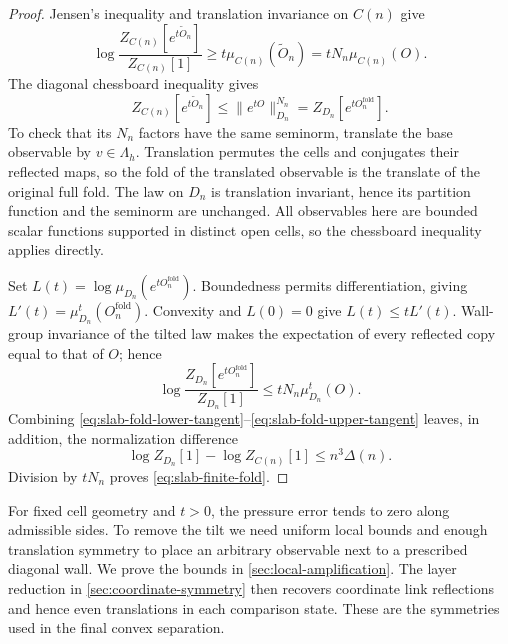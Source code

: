 \begin{proof}
Jensen's inequality and translation invariance on $C(n)$ give
\begin{equation}\label{eq:slab-fold-lower-tangent}
 \log\frac{Z_{C(n)}[e^{t\widetilde O_n}]}{Z_{C(n)}[1]}
                     \ge t\mu_{C(n)}(\widetilde O_n)
                     =tN_n\mu_{C(n)}(O).
\end{equation}
The diagonal chessboard inequality gives
\begin{equation}\label{eq:slab-fold-change}
 Z_{C(n)}[e^{t\widetilde O_n}]
               \le\|e^{tO}\|_{D_n}^{N_n}
               =Z_{D_n}[e^{tO_n^{\mathrm{fold}}}].
\end{equation}
To check that its $N_n$ factors have the same seminorm, translate
the base observable by $v\in\Lambda_h$. Translation permutes the cells
and conjugates their reflected maps, so the fold of the translated
observable is the translate of the original full fold. The law on
$D_n$ is translation invariant, hence its partition function and
the seminorm are unchanged. All observables here are bounded scalar
functions supported in distinct open cells, so the chessboard
inequality applies directly.

Set $L(t)=\log\mu_{D_n}(e^{tO_n^{\mathrm{fold}}})$. Boundedness
permits differentiation, giving
$L'(t)=\mu_{D_n}^t(O_n^{\mathrm{fold}})$. Convexity and $L(0)=0$
give $L(t)\le tL'(t)$. Wall-group invariance of the tilted law makes
the expectation of every reflected copy equal to that of $O$; hence
\begin{equation}\label{eq:slab-fold-upper-tangent}
 \log\frac{Z_{D_n}[e^{tO_n^{\mathrm{fold}}}]}{Z_{D_n}[1]}
                          \le tN_n\mu_{D_n}^t(O).
\end{equation}
Combining \eqref{eq:slab-fold-lower-tangent}--\eqref{eq:slab-fold-upper-tangent}
leaves, in addition, the normalization difference
\[
 \log Z_{D_n}[1]-\log Z_{C(n)}[1]\le n^3\Delta(n).
\]
Division by $tN_n$ proves \eqref{eq:slab-finite-fold}.
\end{proof}

For fixed cell geometry and $t>0$, the pressure error tends to
zero along admissible sides. To remove the tilt we need uniform local
bounds and enough translation symmetry to place an arbitrary observable
next to a prescribed diagonal wall. We prove the bounds in
\cref{sec:local-amplification}. The layer reduction in
\cref{sec:coordinate-symmetry} then recovers coordinate link reflections
and hence even translations in each comparison state. These are the
symmetries used in the final convex separation.

